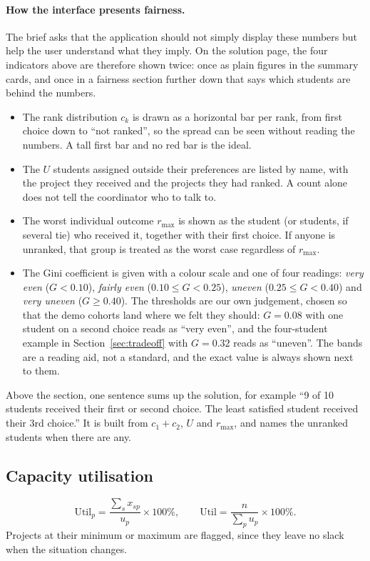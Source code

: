 \documentclass[11pt,a4paper]{article}
\begin{document}
\paragraph{How the interface presents fairness.}
The brief asks that the application should not simply display these numbers
but help the user understand what they imply. On the solution page, the four
indicators above are therefore shown twice: once as plain figures in the
summary cards, and once in a fairness section further down that says which
students are behind the numbers.
\begin{itemize}
  \item The rank distribution $c_k$ is drawn as a horizontal bar per rank,
        from first choice down to ``not ranked'', so the spread can be seen
        without reading the numbers. A tall first bar and no red bar is the ideal.
  \item The $U$ students assigned outside their preferences are listed by
        name, with the project they received and the projects they had
        ranked. A count alone does not tell the coordinator who to talk to.
  \item The worst individual outcome $r_{\max}$ is shown as the student (or
        students, if several tie) who received it, together with their first
        choice. If anyone is unranked, that group is treated as the worst
        case regardless of $r_{\max}$.
  \item The Gini coefficient is given with a colour scale and one of four
        readings: \emph{very even} ($G < 0.10$), \emph{fairly even}
        ($0.10 \le G < 0.25$), \emph{uneven} ($0.25 \le G < 0.40$) and
        \emph{very uneven} ($G \ge 0.40$). The thresholds are our own
        judgement, chosen so that the demo cohorts land where we felt they
        should: $G = 0.08$ with one student on a second choice reads as
        ``very even'', and the four-student example in
        Section~\ref{sec:tradeoff} with $G = 0.32$ reads as ``uneven''. The
        bands are a reading aid, not a standard, and the exact value is
        always shown next to them.
\end{itemize}
Above the section, one sentence sums up the solution, for example
``9 of 10 students received their first or second choice. The least
satisfied student received their 3rd choice.'' It is built from $c_1 + c_2$,
$U$ and $r_{\max}$, and names the unranked students when there are any.

\subsection{Capacity utilisation}
\begin{equation*}
  \text{Util}_p = \frac{\sum_{s} x_{sp}}{u_p} \times 100\%,
  \qquad
  \text{Util} = \frac{n}{\sum_{p} u_p} \times 100\%.
\end{equation*}
Projects at their minimum or maximum are flagged, since they leave no slack
when the situation changes.
\end{document}
